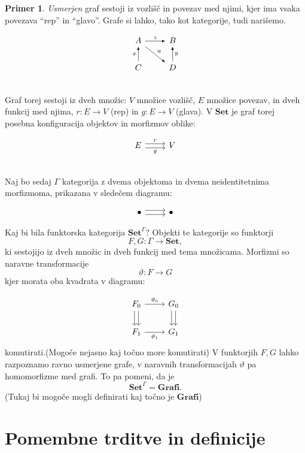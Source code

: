 \documentclass[12pt,a4paper]{book}
\theoremstyle{definition}
\theoremstyle{plain}
\theoremstyle{definition}
\newtheorem{primer}{Primer}[section]
\theoremstyle{remark}
\newcommand{\cat}[1]{\textbf{#1}}
\begin{document}
\begin{primer} \label{grafi}
\emph{Usmerjen} graf sestoji iz vozlišč in povezav med njimi, kjer ima vsaka povezava "`rep"' in "`glavo"'. Grafe si lahko, tako kot kategorije, tudi narišemo.

$$
\begin{tikzcd}[arrow style=tikz, >=latex]
A \ar[r, "z"] \ar[rd, "u"] & B \\
C \ar[u, "x"] & D \ar[u, "y"'] \\
\end{tikzcd}
$$
Graf torej sestoji iz dveh množic: $V$ množice vozlišč, $E$ množice povezav, in dveh funkcij med njima, $r : E \to V$ (rep) in $g : E \to V$ (glava). V $\cat{Set}$ je graf torej posebna konfiguracija objektov in morfizmov oblike:

$$
\begin{tikzcd}
E \ar[r, shift left, "r"] \ar[r, shift right, "g"'] & V \\
\end{tikzcd}
$$

Naj bo sedaj $\Gamma$ kategorija z dvema objektoma in dvema neidentitetnima morfizmoma, prikazana v sledečem diagramu:

$$
\begin{tikzcd}
\bullet \ar[r, shift left] \ar[r, shift right] & \bullet
\end{tikzcd}
$$

Kaj bi bila funktorska kategorija $\cat{Set}^\Gamma$? Objekti te kategorije so funktorji 
$$F,G : \Gamma \to \cat{Set},$$
ki sestojijo iz dveh množic in dveh funkcij med tema množicama. Morfizmi so naravne transformacije
$$\vartheta : F \to G$$
kjer morata oba kvadrata v diagramu:

$$
\begin{tikzcd}
F_0 \ar[r, "\vartheta_0"] \ar[d, shift left] \ar[d, shift right] & G_0 \ar[d, shift left] \ar[d, shift right] \\
F_1 \ar[r, "\vartheta_1"'] & G_1
\end{tikzcd}
$$
komutirati.(Mogoče nejasno kaj točno more komutirati)
V funktorjih $F,G$ lahko razpoznamo ravno usmerjene grafe, v naravnih transformacijah $\vartheta$ pa homomorfizme med grafi. To pa pomeni, da je
$$\cat{Set}^\Gamma = \cat{Grafi}.$$
(Tukaj bi mogoče mogli definirati kaj točno je $\cat{Grafi}$)
\end{primer}

\chapter{Pomembne trditve in definicije}
\end{document}
